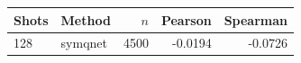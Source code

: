 \begin{tabular}{llrrr}
\toprule
Shots & Method & $n$ & Pearson & Spearman \\
\midrule
128 & symqnet & 4500 & -0.0194 & -0.0726 \\
\bottomrule
\end{tabular}
